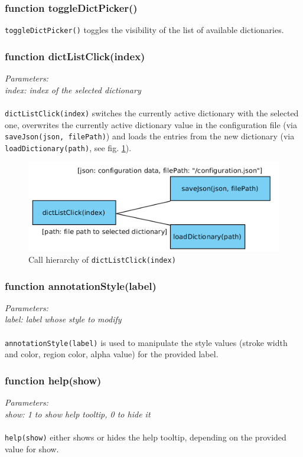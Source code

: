 \subsubsection{function toggleDictPicker()}
\texttt{toggleDictPicker()} toggles the visibility of the list of available dictionaries.


\subsubsection{function dictListClick(index)}
\emph{Parameters:\\
	index: index of the selected dictionary\\ \\
}
\texttt{dictListClick(index)} switches the currently active dictionary with the selected one, overwrites the currently active dictionary value in the configuration file (via \texttt{saveJson(json, filePath)}) and loads the entries from the new dictionary (via \texttt{loadDictionary(path)}, see fig. \ref{figB_selectDict}).

\begin{figure}[H]
	\begin{center}
		\includegraphics[scale=0.5]{img/ch_selectDict.png}
		\caption{Call hierarchy of \texttt{dictListClick(index)}}
		\label{figB_selectDict}
	\end{center}
\end{figure}


\subsubsection{function annotationStyle(label)}
\emph{Parameters:\\
	label: label whose style to modify\\ \\
}
\texttt{annotationStyle(label)} is used to manipulate the style values (stroke width and color, region color, alpha value) for the provided label.


\subsubsection{function help(show)}
\emph{Parameters:\\
	show: 1 to show help tooltip, 0 to hide it\\ \\
}
\texttt{help(show)} either shows or hides the help tooltip, depending on the provided value for show.


